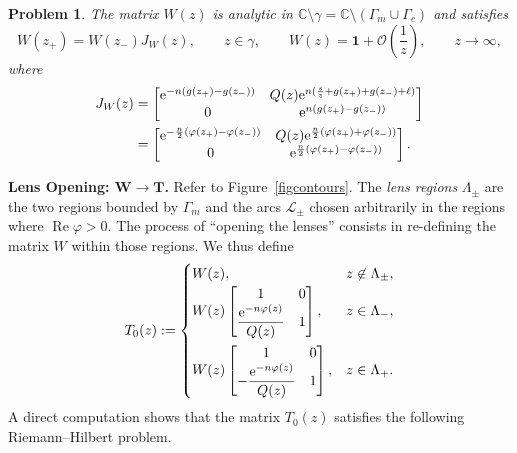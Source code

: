 \documentclass[pdftex]{sigma}
\numberwithin{equation}{section}
\newtheorem{problem}[Theorem]{Problem}
\theoremstyle{definition}
\def \scr{\mathscr}
\def \ds{\displaystyle}
\def\le{\left}
\def\ri{\right}
\def \1{\mathbf 1}
\def\C{{\mathbb C}}
\def \Re{\operatorname{Re} }
\begin{document}
\begin{problem}
\label{RHPW}The matrix $W(z)$ is analytic in $\C \setminus \gamma = \C\setminus (\Gamma_m\cup \Gamma_c)$ and satisfies
\[
W(z_+)= W(z_-) J_W(z), \qquad z\in \gamma,\qquad
W(z) = \1 + \mathcal O\le(\frac 1 z \ri), \qquad z\to \infty,
\]
where
\begin{align*}
J_W(z) &= \begin{bmatrix}
{\rm e}^{-n(g(z_+)-g(z_-))} & Q(z) {\rm e}^{ n(\frac s z + g(z_+)+ g(z_-) + \ell)}\\
0 & {\rm e}^{n(g(z_+)-g(z_-))}
\end{bmatrix}\\
&=\begin{bmatrix}
{\rm e}^{-\frac n2( \varphi(z_+)-\varphi(z_-)) } & Q(z) {\rm e}^{ \frac n2 (\varphi(z_+)+\varphi(z_-))}\\
0 & {\rm e}^{\frac n2 (\varphi(z_+)-\varphi(z_-) )}
\end{bmatrix}.
\end{align*}
\end{problem}
{\bf Lens Opening: $\boldsymbol{W\to T}$.}
Refer to Figure~\ref{figcontours}. The {\it lens regions} $\Lambda_\pm$ are the two regions bounded by $\Gamma_m$ and the arcs $\scr L_\pm$ chosen arbitrarily in the regions where $\Re \varphi>0$.
The process of ``opening the lenses'' consists in re-defining the matrix $W$ within those regions.
We thus define
\begin{gather}
\label{defT}
T_0(z):=
\begin{cases}
W(z), & z\not \in \Lambda_\pm,\\
\ds W(z)\begin{bmatrix}
1 & 0 \\
\displaystyle \frac{{\rm e}^{-n\varphi(z)}}{Q(z)} & 1
\end{bmatrix}, & z\in \Lambda_-,
\vspace{1mm}\\
W(z) \begin{bmatrix}
1 & 0 \\
\displaystyle-\frac{ {\rm e}^{-n\varphi(z)}}{Q(z)} & 1
\end{bmatrix}, & z\in \Lambda_+.
\end{cases}
\end{gather}
A direct computation shows that the matrix $T_0(z)$ satisfies the following Riemann--Hilbert problem.
\end{document}

